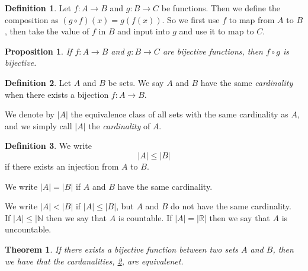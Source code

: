 \documentclass{article}
\newtheorem{theorem}{Theorem}[section]
\newtheorem{proposition}{Proposition}[section]
\theoremstyle{definition}
\newtheorem{definition}{Definition}[section]
\theoremstyle{remark}
\begin{document}
\begin{definition}
Let $f: A \to B$ and $g:B \to C$ be functions. Then we define the composition as $(g \circ f)(x) = g(f(x))$. So we first use $f$ to map from $A$ to $B$, then take the value of $f$ in $B$ and input into $g$ and use it to map to $C$.
\end{definition}



\begin{proposition}
If $f: A \to B$ and $g: B\to C$ are bijective functions, then $f \circ g$ is bijective.
\end{proposition}






\begin{definition} \label{def:cardinality}
Let \( A \) and \( B \) be sets. We say \( A \) and \( B \) have the same \textit{cardinality} when there exists a bijection \( f: A \to B \). 

We denote by \( |A| \) the equivalence class of all sets with the same cardinality as \( A \), and we simply call \( |A| \) the \textit{cardinality} of \( A \).
\end{definition}




















\begin{definition} \label{def:cardinality_comparison}
We write
\[
|A| \leq |B|
\]
if there exists an injection from \( A \) to \( B \). 

We write \( |A| = |B| \) if \( A \) and \( B \) have the same cardinality. 

We write \( |A| < |B| \) if \( |A| \leq |B| \), but \( A \) and \( B \) do not have the same cardinality.\\
If $ |A| \leq |\mathbb{N}$ then we say that $A$ is countable. If $|A| = |\mathbb{R}|$ then we say that $A$ is uncountable.
\end{definition}





\begin{theorem}
If there exists a bijective function between two sets $A$ and $B$, then we have that the cardanalities, \ref{def:cardinality}, are equivalenet. 
\end{theorem}
\end{document}
